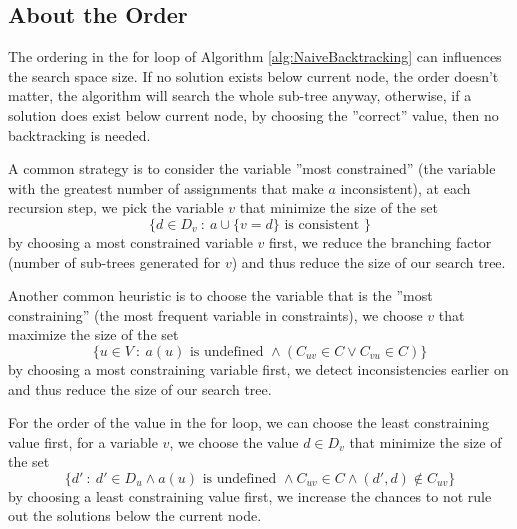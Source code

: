 \documentclass[10pt, letterpaper]{report}
\begin{document}
\subsection{About the Order}
The ordering in the for loop of Algorithm \ref{alg:NaiveBacktracking} can  influences the search space size. If no solution exists below current node, the order doesn't matter, the algorithm will search the whole sub-tree anyway, otherwise, if a solution does exist below current node, by choosing the ''correct'' value, then no backtracking is needed.\bigskip 

A common strategy is to consider the variable ''most constrained'' (the variable with the greatest number of assignments that make $a$ inconsistent), at each recursion step, we pick the variable $v$ that minimize the size of the set\begin{equation}
    \{d\in D_v \ : \ a\cup\{v=d\} \text{ is consistent }\}
\end{equation}
by choosing a most constrained variable $v$ first, we reduce the
branching factor (number of sub-trees generated for $v$) and thus reduce
the size of our search tree.\bigskip 

Another common heuristic is to choose the variable that is the ''most constraining'' (the most frequent variable in constraints), we choose $v$ that maximize the size of the set\begin{equation}
    \{u\in V \ : \ a(u)\text{ is undefined }\land \left(C_{uv}\in C \lor C_{vu}\in C\right) \}
\end{equation}
by choosing a most constraining variable first, we detect
inconsistencies earlier on and thus reduce the size of our search tree.\bigskip 

For the order of the value in the for loop, we can choose the least constraining value first, for a variable $v$, we choose the value $d\in D_v$ that minimize the size of the set\begin{equation}
    \{d' \ : \ d'\in D_u\land a(u)\text{ is undefined }\land C_{uv}\in C\land (d',d)\notin C_{uv}\}
\end{equation}
by choosing a least constraining value first, we increase the chances
to not rule out the solutions below the current node. 
\end{document}
